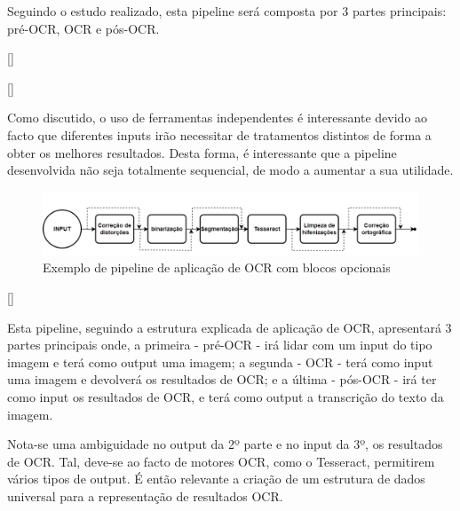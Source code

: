 Seguindo o estudo realizado, esta pipeline será composta por 3 partes principais: pré-OCR, OCR e pós-OCR.





[\normalsize]

[\normalsize]
 
 
Como discutido, o uso de ferramentas independentes é interessante devido ao facto que diferentes inputs irão necessitar de tratamentos distintos de forma a obter os melhores resultados. Desta forma, é interessante que a pipeline desenvolvida não seja totalmente sequencial, de modo a aumentar a sua utilidade.



\begin{figure}[H]
	\centering
	\includegraphics[width=1\textwidth]{images/diagramas/pipeline_exemplo_opcoes.png}
	\caption{Exemplo de pipeline de aplicação de OCR com blocos opcionais}
	\label{fig:pipeline_example_options}
\end{figure}


[\normalsize]

Esta pipeline, seguindo a estrutura explicada de aplicação de OCR, apresentará 3 partes principais onde, a primeira - pré-OCR - irá lidar com um input do tipo imagem e terá como output uma imagem; a segunda - OCR - terá como input uma imagem e devolverá os resultados de OCR; e a última - pós-OCR - irá ter como input os resultados de OCR, e terá como output a transcrição do texto da imagem.

Nota-se uma ambiguidade no output da 2º parte e no input da 3º, os resultados de OCR. Tal, deve-se ao facto de motores OCR, como o Tesseract, permitirem vários tipos de output. É então relevante a criação de um estrutura de dados universal para a representação de resultados OCR.

